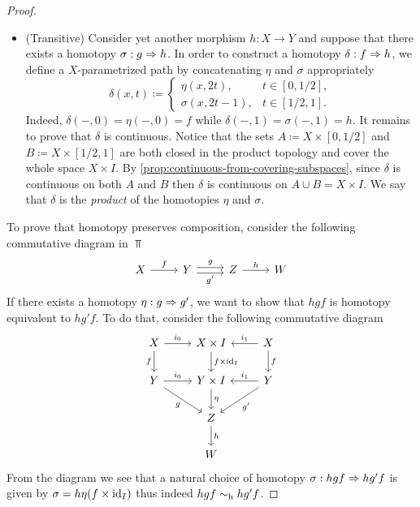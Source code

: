 \begin{proof}
\begin{itemize}
        \item (Transitive) Consider yet another morphism \(h: X \to Y\) and suppose that
              there exists a homotopy \(\sigma: g \Rightarrow h\). In order to construct a homotopy
              \(\delta: f \Rightarrow h\), we define a \(X\)-parametrized path by concatenating
              \(\eta\) and \(\sigma\) appropriately
              \[
                  \delta(x, t) \coloneq
                  \begin{cases}
                      \eta(x, 2 t),       & t \in [0, 1/2], \\
                      \sigma(x, 2 t - 1), & t \in [1/2, 1].
                  \end{cases}
              \]
              Indeed, \(\delta(-, 0) = \eta(-, 0) = f\) while
              \(\delta(-, 1) = \sigma(-, 1) = h\). It remains to prove that \(\delta\) is
              continuous. Notice that the sets \(A \coloneq X \times [0, 1/2]\) and
              \(B \coloneq X \times [1/2, 1]\) are both closed in the product topology and
              cover the whole space \(X \times I\). By
              \cref{prop:continuous-from-covering-subspaces}, since \(\delta\)
              is continuous on both \(A\) and \(B\) then \(\delta\) is continuous on
              \(A \cup B = X \times I\). We say that \(\delta\) is the \emph{product} of the
              homotopies \(\eta\) and \(\sigma\).
    \end{itemize}
    To prove that homotopy preserves composition, consider the following commutative
    diagram in \(\Top\)
    \[
        \begin{tikzcd}
            X \ar[r, "f"]
            &Y \ar[r, shift left, "g"] \ar[r, shift right, "g'"']
            &Z \ar[r, "h"]
            &W
        \end{tikzcd}
    \]
    If there exists a homotopy \(\eta: g \Rightarrow g'\), we want to show that \(h g f\)
    is homotopy equivalent to \(h g' f\). To do that, consider the following
    commutative diagram
    \[
        \begin{tikzcd}
            X \ar[r, "i_0"] \ar[d, "f"']
            &X \times I \ar[d, "f \times \Id_I"]
            &X \ar[l, "i_1"'] \ar[d, "f"]
            \\
            Y \ar[r, "i_0"] \ar[dr, "g"']
            &Y \times I \ar[d, "\eta"]
            &Y \ar[l, "i_1"'] \ar[dl, "g'"]
            \\
            &Z \ar[d, "h"] &
            \\
            &W &
        \end{tikzcd}
    \]
    From the diagram we see that a natural choice of homotopy
    \(\sigma: h g f \Rightarrow h g' f\) is given by \(\sigma = h \eta (f \times \operatorname{id}_I)\)
    thus indeed \(h g f \sim_{\text{h}} h g' f\).
\end{proof}

